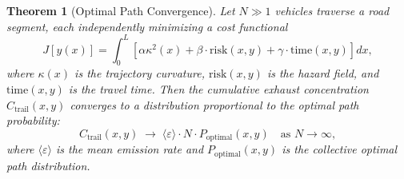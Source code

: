 \documentclass[11pt,twocolumn,a4paper]{article}
\theoremstyle{plain}
\newtheorem{theorem}{Theorem}[section]
\theoremstyle{definition}
\theoremstyle{remark}
\newcommand{\Ctrail}{C_{\mathrm{trail}}}
\begin{document}
\begin{theorem}[Optimal Path Convergence]
\label{thm:optimal_path}
Let $N \gg 1$ vehicles traverse a road segment, each independently minimizing a cost functional
\begin{equation}
J[y(x)] = \int_0^L \left[\alpha \kappa^2(x) + \beta \cdot \mathrm{risk}(x, y) + \gamma \cdot \mathrm{time}(x, y)\right] dx,
\label{eq:cost_functional}
\end{equation}
where $\kappa(x)$ is the trajectory curvature, $\mathrm{risk}(x,y)$ is the hazard field, and $\mathrm{time}(x,y)$ is the travel time. Then the cumulative exhaust concentration $\Ctrail(x, y)$ converges to a distribution proportional to the optimal path probability:
\begin{equation}
\Ctrail(x, y) \;\to\; \langle\varepsilon\rangle \cdot N \cdot P_{\mathrm{optimal}}(x, y) \quad \text{as } N \to \infty,
\label{eq:optimal_path}
\end{equation}
where $\langle\varepsilon\rangle$ is the mean emission rate and $P_{\mathrm{optimal}}(x,y)$ is the collective optimal path distribution.
\end{theorem}
\end{document}
